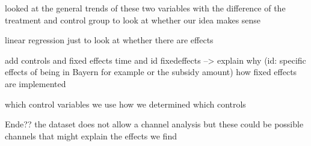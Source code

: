 \documentclass[12pt, a4paper, titlepage]{article}\usepackage[]{graphicx}\usepackage[]{color}
\begin{document}
looked at the general trends of these two variables with the difference of the treatment and control group to look at whether our idea makes sense

linear regression just to look at whether there are effects

add controls and fixed effects time and id fixedeffects --> explain why (id: specific effects of being in Bayern for example or the subsidy amount)
how fixed effects are implemented

which control variables we use
how we determined which controls






Ende??
the dataset does not allow a channel analysis but these could be possible channels that might explain the effects we find
\end{document}
